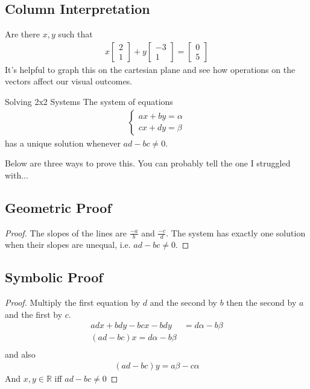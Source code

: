 \documentclass[11pt]{article}
\begin{document}
\subsection{Column Interpretation}
Are there $x,y$ such that
\begin{align*}
    x
    \begin{bmatrix}
        2 \\
        1
    \end{bmatrix}
    + y
    \begin{bmatrix}
        -3 \\
        1
    \end{bmatrix}
    =
    \begin{bmatrix}
        0 \\
        5
    \end{bmatrix}
\end{align*}
It's helpful to graph this on the cartesian plane and see how operations on the vectors affect our visual outcomes.

\begin{theorembox}{Solving 2x2 Systems}
    The system of equations
    \begin{align*}
        \begin{cases}
            ax+by=\alpha \\
            cx+dy=\beta
        \end{cases}
    \end{align*}
    has a unique solution whenever $ad-bc \neq 0$.
\end{theorembox}
Below are three ways to prove this. You can probably tell the one I struggled with...

\subsection{Geometric Proof}
\begin{proof}
    The slopes of the lines are $\frac{-a}{b}$ and $\frac{-c}{d}$. The system has exactly one solution when their slopes are unequal, i.e. $ad-bc \neq 0$.
\end{proof}

\subsection{Symbolic Proof}
\begin{proof}
    Multiply the first equation by $d$ and the second by $b$ then the second by $a$ and the first by $c$.
    \begin{align*}
        adx+bdy-bcx-bdy&=d\alpha - b\beta \\
        (ad-bc)x=d\alpha -b\beta \\
    \end{align*}
    and also
    \begin{align*}
        (ad-bc)y=a\beta -c\alpha
    \end{align*}
    And $x,y \in \mathbb{R}$ iff $ad-bc \neq 0$
\end{proof}
\end{document}
